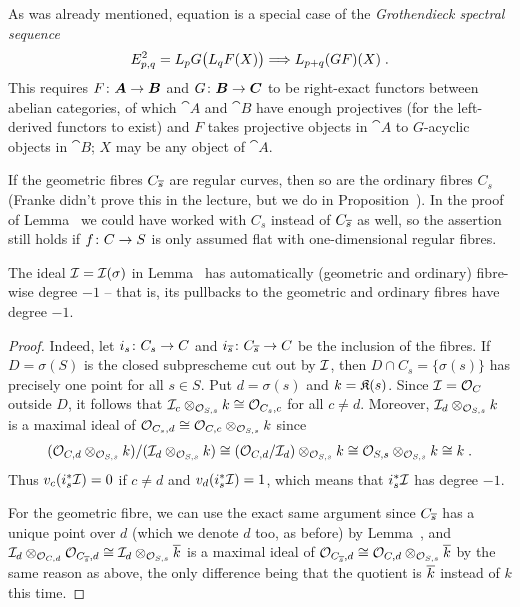 \documentclass[a4paper,parskip=half,numbers=enddot, DIV=12]{scrreprt}
\begin{document}
\begin{rem}
	As was already mentioned, equation  is a special case of the \emph{Grothendieck spectral sequence}
	\begin{align*}
		E_{p,q}^2=L_pG\big(L_qF(X)\big)\converge L_{p+q}(GF)(X)\;.
	\end{align*}
	This requires $F\colon \cat A\morphism \cat B$ and $G\colon \cat B\morphism\cat C$ to be right-exact functors between abelian categories, of which $\cat A$ and $\cat B$ have enough projectives (for the left-derived functors to exist) and $F$ takes projective objects in $\cat A$ to $G$-acyclic objects in $\cat B$; $X$ may be any object of $\cat A$.
\end{rem}
\begin{rem}
	If the geometric fibres $C_{\overline{s}}$ are regular curves, then so are the ordinary fibres $C_s$ (Franke didn't prove this in the lecture, but we do in Proposition~). In the proof of Lemma~ we could have worked with $C_s$ instead of $C_{\overline{s}}$ as well, so the assertion still holds if $f\colon C\morphism S$ is only assumed flat with one-dimensional regular fibres.
\end{rem}
\begin{lem}
	The ideal $\mathcal{I}=\mathcal{I}(\sigma)$ in Lemma~ has automatically (geometric and ordinary) fibre-wise degree $-1$ -- that is, its pullbacks to the geometric and ordinary fibres have degree $-1$.
\end{lem}
\begin{proof}
	Indeed, let $i_s\colon C_s\morphism C$ and $i_{\ov{s}}\colon C_{\ov{s}}\morphism C$ be the inclusion of the fibres. If $D=\sigma(S)$ is the closed subprescheme cut out by $\mathcal{I}$, then $D\cap C_s=\{\sigma(s)\}$ has precisely one point for all $s\in S$. Put $d=\sigma(s)$ and $k=\mathfrak{K}(s)$. Since $\mathcal{I}=\mathcal{O}_C$ outside $D$, it follows that $\mathcal{I}_c\otimes_{\mathcal{O}_{S,s}}k\cong \mathcal{O}_{C_s,c}$ for all $c\neq d$. Moreover, $\mathcal{I}_d\otimes_{\mathcal{O}_{S,s}}k$ is a maximal ideal of $\mathcal{O}_{C_s,d}\cong \mathcal{O}_{C,c}\otimes_{\mathcal{O}_{S,s}}k$ since
	\begin{align*}
		(\mathcal{O}_{C,d}\otimes_{\mathcal{O}_{S,s}}k)/(\mathcal{I}_d\otimes_{\mathcal{O}_{S,s}}k)\cong (\mathcal{O}_{C,d}/\mathcal{I}_d)\otimes_{\mathcal{O}_{S,s}}k\cong \mathcal{O}_{S,s}\otimes_{\mathcal{O}_{S,s}}k\cong k\;.
	\end{align*}
	Thus $v_c(i_s^*\mathcal{I})=0$ if $c\neq d$ and $v_d(i_s^*\mathcal{I})=1$, which means that $i_s^*\mathcal{I}$ has degree $-1$.
	
	For the geometric fibre, we can use the exact same argument since $C_{\overline{s}}$ has a unique point over $d$ (which we denote $d$ too, as before) by Lemma~, and $\mathcal{I}_d\otimes_{\mathcal{O}_{C,d}}\mathcal{O}_{C_{\overline{s}},d}\cong \mathcal{I}_d\otimes_{\mathcal{O}_{S,s}}\overline{k}$ is a maximal ideal of $\mathcal{O}_{C_{\overline{s}},d}\cong \mathcal{O}_{C,d}\otimes_{\mathcal{O}_{S,s}}\overline{k}$ by the same reason as above, the only difference being that the quotient is $\overline{k}$ instead of $k$ this time.
\end{proof}
\end{document}
